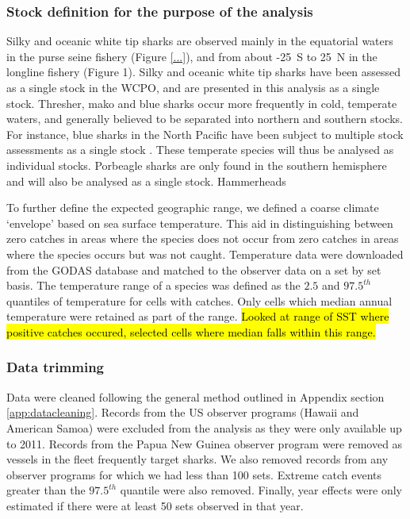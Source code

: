 \documentclass{SCreport}
\begin{document}
\subsubsection{Stock definition for the purpose of the analysis}

Silky and oceanic white tip sharks are observed mainly in the equatorial waters in the purse seine fishery (Figure \ref{...}), and from about -25\degree~S to 25\degree~N in the longline fishery (Figure 1). Silky and oceanic white tip sharks have been assessed \citep{Rice2012_a, Rice2013_a} as a single stock in the WCPO, and are presented in this analysis as a single stock.  Thresher, mako and blue sharks occur more frequently in cold, temperate waters, and generally believed to be separated into northern and southern stocks. For instance, blue sharks in the North Pacific have been subject to multiple stock assessments as a single stock \citep{XXXX}. These temperate species will thus be analysed as individual stocks. Porbeagle sharks are only found in the southern hemisphere and will also be analysed as a single stock. Hammerheads 

To further define the expected geographic range, we defined a coarse climate `envelope' based on sea surface temperature. This aid in distinguishing between zero catches in areas where the species does not occur from zero catches in areas where the species occurs but was not caught. Temperature data were downloaded from the GODAS database \citep{GODASXXXX_a} and matched to the observer data on a set by set basis. The temperature range of a species was defined as the $2.5$ and $97.5^{th}$ quantiles of temperature for cells with catches. Only cells which median annual temperature were retained as part of the range. 
\hl{Looked at range of SST where positive catches occured, selected cells where median falls within this range.}
\subsubsection{Data trimming}
Data were cleaned following the general method outlined in Appendix section \ref{app:datacleaning}. Records from the US observer programs (Hawaii and American Samoa) were excluded from the analysis as they were only available up to 2011. Records from the Papua New Guinea observer program were removed as vessels in the fleet frequently target sharks. We also removed records from any observer programs for which we had less than 100 sets. Extreme catch events greater than the $97.5^{th}$ quantile were also removed. Finally, year effects were only estimated if there were at least 50 sets observed in that year.
\end{document}
